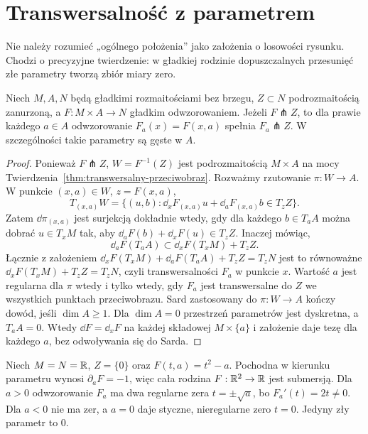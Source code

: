 \section{Transwersalność z parametrem}
\label{sec:transwersalnosc-param}

Nie należy rozumieć „ogólnego położenia” jako
założenia o losowości rysunku. Chodzi o precyzyjne
twierdzenie: w gładkiej rodzinie dopuszczalnych
przesunięć złe parametry tworzą zbiór miary zero.

\begin{twierdzenie}
\label{thm:transwersalnosc-param}
Niech $M,A,N$ będą gładkimi rozmaitościami bez brzegu,
$Z\subset N$ podrozmaitością zanurzoną, a
$F:M\times A\to N$ gładkim odwzorowaniem.
Jeżeli $F\pitchfork Z$, to dla prawie każdego
$a\in A$ odwzorowanie $F_a(x)=F(x,a)$ spełnia
$F_a\pitchfork Z$. W szczególności takie
parametry są gęste w $A$.
\end{twierdzenie}
\begin{proof}
Ponieważ $F\pitchfork Z$,
$W=F^{-1}(Z)$ jest podrozmaitością
$M\times A$ na mocy
Twierdzenia~\ref{thm:transwersalny-przeciwobraz}.
Rozważmy rzutowanie $\pi:W\to A$.
W punkcie $(x,a)\in W$, $z=F(x,a)$,
\[
 T_{(x,a)}W
 =\{(u,b):\dd_xF_{(x,a)}u
              +\dd_aF_{(x,a)}b\in T_zZ\}.
\]
Zatem $\dd\pi_{(x,a)}$ jest surjekcją
dokładnie wtedy, gdy dla każdego $b\in T_aA$
można dobrać $u\in T_xM$ tak, aby
$\dd_aF(b)+\dd_xF(u)\in T_zZ$.
Inaczej mówiąc,
\[
 \dd_aF(T_aA)\subset
                 \dd_xF(T_xM)+T_zZ.
\]
Łącznie z założeniem
$\dd_xF(T_xM)+\dd_aF(T_aA)+T_zZ=T_zN$
jest to równoważne
$\dd_xF(T_xM)+T_zZ=T_zN$, czyli
transwersalności $F_a$ w punkcie $x$.
Wartość $a$ jest regularna dla $\pi$
wtedy i tylko wtedy, gdy $F_a$ jest
transwersalne do $Z$ we wszystkich punktach
przeciwobrazu. Sard zastosowany do
$\pi:W\to A$ kończy dowód, jeśli $\dim A\geq1$.
Dla $\dim A=0$ przestrzeń parametrów jest dyskretna,
a $T_aA=0$. Wtedy $\dd F=\dd_xF$ na każdej składowej
$M\times\{a\}$ i założenie daje tezę dla każdego $a$,
bez odwoływania się do Sarda.
\end{proof}

\begin{przyklad}
\label{prz:transwersalne-parabola}
Niech $M=N=\mathbb{R}$, $Z=\{0\}$ oraz
$F(t,a)=t^2-a$. Pochodna w kierunku parametru
wynosi $\partial_aF=-1$, więc cała rodzina
$F:\mathbb{R}^2\to\mathbb{R}$ jest submersją.
Dla $a>0$ odwzorowanie $F_a$ ma dwa regularne zera
$t=\pm\sqrt a$, bo $F_a'(t)=2t\ne0$.
Dla $a<0$ nie ma zer, a $a=0$ daje
styczne, nieregularne zero $t=0$.
Jedyny zły parametr to $0$.
\end{przyklad}

